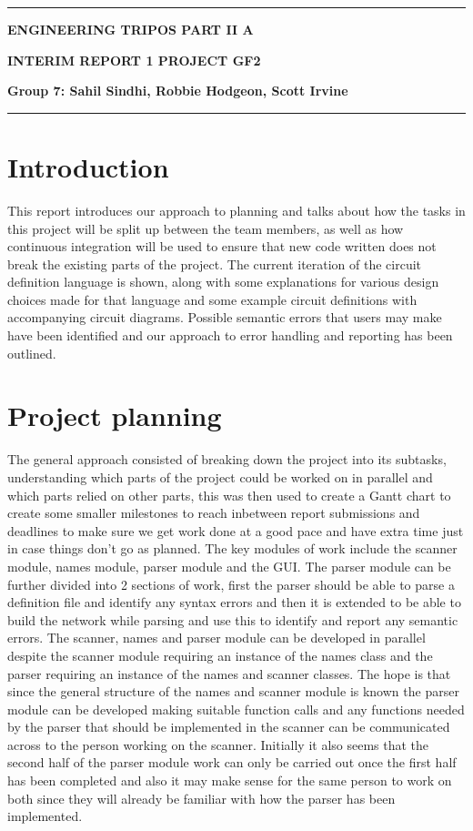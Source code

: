 \documentclass[10pt]{article}
\begin{document}
\noindent
\rule{15.7cm}{0.5mm}
\lstset{language=c++}



\begin{center}
{\bf ENGINEERING TRIPOS PART II A}
\end{center}
\vspace{0.5cm} {\bf INTERIM REPORT 1 \hfill PROJECT GF2}
\vspace{0.5cm} 
\begin{center}
{\bf Group 7: Sahil Sindhi, Robbie Hodgeon, Scott Irvine
}
\end{center}
\rule{15.7cm}{0.5mm}

\section{Introduction}
This report introduces our approach to planning and talks about how the tasks in this project will be split up between the team members, as well as how continuous integration will be used to ensure that new code written does not break the existing parts of the project. The current iteration of the circuit definition language is shown, along with some explanations for various design choices made for that language and some example circuit definitions with accompanying circuit diagrams. Possible semantic errors that users may make have been identified and our approach to error handling and reporting has been outlined.

\section{Project planning}

The general approach consisted of breaking down the project into its subtasks, understanding which parts of the project could be worked on in parallel and which parts relied on other parts, this was then used to create a Gantt chart to create some smaller milestones to reach inbetween report submissions and deadlines to make sure we get work done at a good pace and have extra time just in case things don't go as planned. The key modules of work include the scanner module, names module, parser module and the GUI. The parser module can be further divided into 2 sections of work, first the parser should be able to parse a definition file and identify any syntax errors and then it is extended to be able to build the network while parsing and use this to identify and report any semantic errors. The scanner, names and parser module can be developed in parallel despite the scanner module requiring an instance of the names class and the parser requiring an instance of the names and scanner classes. The hope is that since the general structure of the names and scanner module is known the parser module can be developed making suitable function calls and any functions needed by the parser that should be implemented in the scanner can be communicated across to the person working on the scanner.
Initially it also seems that the second half of the parser module work can only be carried out once the first half has been completed and also it may make sense for the same person to work on both since they will already be familiar with how the parser has been implemented. \\
\end{document}
